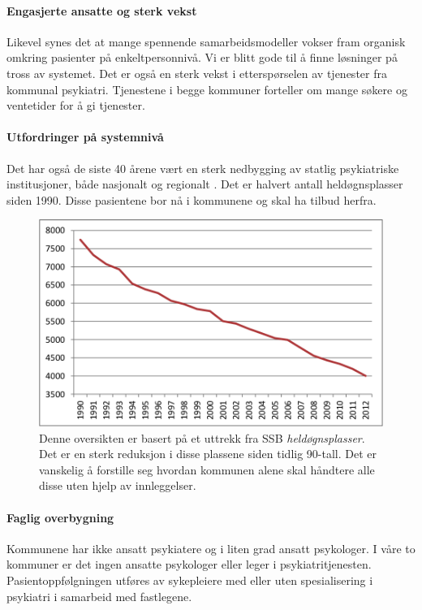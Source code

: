 \documentclass[11pt]{report} %
\begin{document}
                  \paragraph{Engasjerte ansatte og sterk vekst\\}
                    Likevel synes det at mange spennende samarbeidsmodeller vokser fram organisk omkring pasienter på enkeltpersonnivå. Vi er blitt gode til å finne løsninger på tross av systemet. Det er også en sterk vekst i etterspørselen av tjenester fra kommunal psykiatri. Tjenestene i begge kommuner forteller om mange søkere og ventetider for å gi tjenester.
                  \paragraph{Utfordringer på systemnivå\\}  
                    Det har også de siste 40 årene vært en sterk nedbygging av statlig psykiatriske institusjoner, både nasjonalt og regionalt
                    \cite{SSButtrekk1}. Det er halvert antall heldøgnsplasser siden 1990. Disse pasientene bor nå i kommunene og skal ha tilbud herfra. 

                  \begin{figure}[ht]
                    \centering
                    \includegraphics{./pix/heldgnpsykplass}
                    \caption[Oversikt over reduksjon i \textit{heldøgnsplasser}.]
                     {Denne oversikten er basert på et uttrekk fra SSB \textit{heldøgnsplasser}. Det er en sterk reduksjon i disse plassene siden tidlig 90-tall. Det er vanskelig å forstille seg hvordan kommunen alene skal håndtere alle disse uten hjelp av innleggelser.}
                  \end{figure}
                   \paragraph{Faglig overbygning\\}
                    Kommunene har ikke ansatt psykiatere og i liten grad ansatt psykologer. I våre to kommuner er det ingen ansatte psykologer eller leger i psykiatritjenesten. Pasientoppfølgningen utføres av sykepleiere med eller uten spesialisering i psykiatri i samarbeid med fastlegene.
\end{document}
